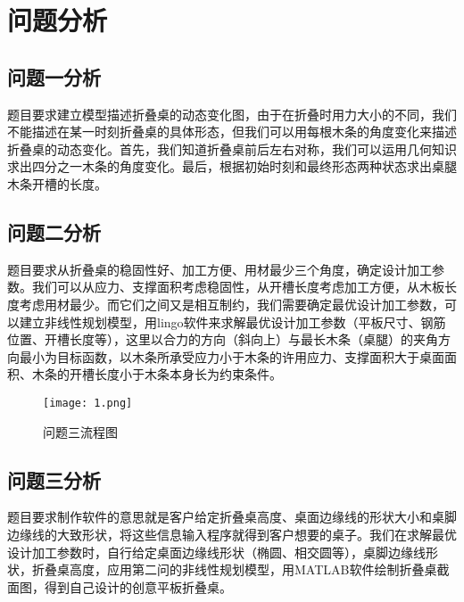 \documentclass[bwprint]{gmcmthesis}
\begin{document}
\section{问题分析}

\subsection{问题一分析}
题目要求建立模型描述折叠桌的动态变化图，由于在折叠时用力大小的不同，我们不能描述在某一时刻折叠桌的具体形态，但我们可以用每根木条的角度变化来描述折叠桌的动态变化。首先，我们知道折叠桌前后左右对称，我们可以运用几何知识求出四分之一木条的角度变化。最后，根据初始时刻和最终形态两种状态求出桌腿木条开槽的长度。



\subsection{问题二分析}
题目要求从折叠桌的稳固性好、加工方便、用材最少三个角度，确定设计加工参数。我们可以从应力、支撑面积考虑稳固性，从开槽长度考虑加工方便，从木板长度考虑用材最少。而它们之间又是相互制约，我们需要确定最优设计加工参数，可以建立非线性规划模型，用lingo软件来求解最优设计加工参数（平板尺寸、钢筋位置、开槽长度等），这里以合力的方向（斜向上）与最长木条（桌腿）的夹角方向最小为目标函数，以木条所承受应力小于木条的许用应力、支撑面积大于桌面面积、木条的开槽长度小于木条本身长为约束条件。
\begin{figure}[!h]
\centering
\texttt{[image: 1.png]}
\caption{问题三流程图}
\end{figure}
\subsection{问题三分析}
题目要求制作软件的意思就是客户给定折叠桌高度、桌面边缘线的形状大小和桌脚边缘线的大致形状，将这些信息输入程序就得到客户想要的桌子。我们在求解最优设计加工参数时，自行给定桌面边缘线形状（椭圆、相交圆等），桌脚边缘线形状，折叠桌高度，应用第二问的非线性规划模型，用MATLAB软件绘制折叠桌截面图，得到自己设计的创意平板折叠桌。




\cite{mittelbach_latex_2004,wright_latex3_2009,beeton_unicode_2008,vieth_experiences_2009}
\end{document}
